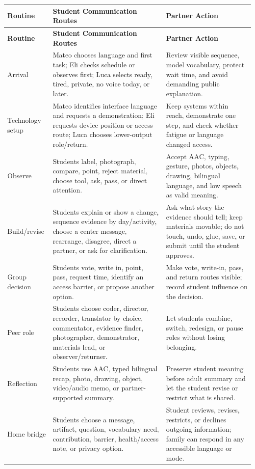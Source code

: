 \documentclass[11pt]{article}
\newcommand{\tableheaderthree}[3]{%
  \rowcolor{PrimaryRed}
  \color{white}\bfseries #1 &
  \color{white}\bfseries #2 &
  \color{white}\bfseries #3 \\
}
\begin{document}
\begin{longtable}{>{\RaggedRight\arraybackslash}p{0.84in} >{\RaggedRight\arraybackslash}p{3.37in} >{\RaggedRight\arraybackslash}p{2.84in}}
\tableheaderthree{Routine}{Student Communication Routes}{Partner Action}
\endfirsthead
\tableheaderthree{Routine}{Student Communication Routes}{Partner Action}
\endhead
Arrival & Mateo chooses language and first task; Eli checks schedule or observes first; Luca selects ready, tired, private, no voice today, or later. & Review visible sequence, model vocabulary, protect wait time, and avoid demanding public explanation. \\
\rowcolor{SoftGray}
Technology setup & Mateo identifies interface language and requests a demonstration; Eli requests device position or access route; Luca chooses lower-output role/return. & Keep systems within reach, demonstrate one step, and check whether fatigue or language changed access. \\
Observe & Students label, photograph, compare, point, reject material, choose tool, ask, pass, or direct attention. & Accept AAC, typing, gesture, photos, objects, drawing, bilingual language, and low speech as valid meaning. \\
\rowcolor{SoftGray}
Build/revise & Students explain or show a change, sequence evidence by day/activity, choose a center message, rearrange, disagree, direct a partner, or ask for clarification. & Ask what story the evidence should tell; keep materials movable; do not touch, undo, glue, save, or submit until the student approves. \\
Group decision & Students vote, write in, point, pass, request time, identify an access barrier, or propose another option. & Make vote, write-in, pass, and return routes visible; record student influence on the decision. \\
\rowcolor{SoftGray}
Peer role & Students choose coder, director, recorder, translator by choice, commentator, evidence finder, photographer, demonstrator, materials lead, or observer/returner. & Let students combine, switch, redesign, or pause roles without losing belonging. \\
Reflection & Students use AAC, typed bilingual recap, photo, drawing, object, video/audio memo, or partner-supported summary. & Preserve student meaning before adult summary and let the student revise or restrict what is shared. \\
\rowcolor{SoftGray}
Home bridge & Students choose a message, artifact, question, vocabulary need, contribution, barrier, health/access note, or privacy option. & Student reviews, revises, restricts, or declines outgoing information; family can respond in any accessible language or mode. \\
\end{longtable}
\normalsize
\end{document}
